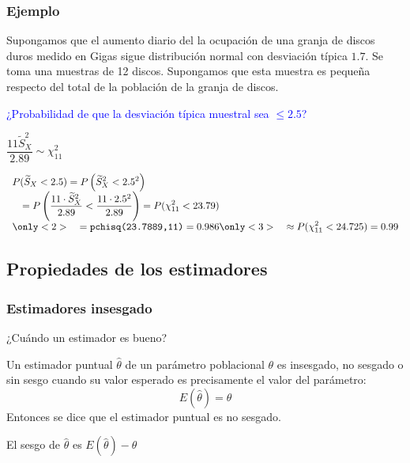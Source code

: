 \documentclass[12pt,t]{beamer}
\newcommand{\blue}[1]{\textcolor{blue}{#1}}
\renewcommand{\emph}[1]{{\color{red}#1}}
\renewcommand{\leq}{\leqslant}
\theoremstyle{plain}
\theoremstyle{definition}
\begin{document}
\begin{frame}
\frametitle{Ejemplo}
\vspace*{-2ex}

Supongamos que  el  aumento  diario del la ocupación de una granja de  discos duros medido  en Gigas sigue distribución normal con desviación típica $1.7$. Se toma una muestras de 12 discos. Supongamos que esta  muestra es pequeña respecto del total de la población de la granja de discos.
\medskip

\blue{¿Probabilidad de que la desviación típica muestral
sea $\leq 2.5$?}
\medskip

$\dfrac{11\widetilde{S}_{X}^2}{2.89}\sim \chi^2_{11}$
\medskip

$\begin{array}{l}
\displaystyle P(\widetilde{S}_{X}<2.5)= P\left(\widetilde{S}_{X}^2<2.5^2\right)\\
\quad \displaystyle =P\left(\frac{11\cdot \widetilde{S}_{X}^2}{2.89}<\frac{11
\cdot 2.5^2}{2.89}\right)= P(\chi_{11}^2<23.79)\\
\only<2>{\quad\displaystyle=\mbox{\texttt{pchisq(23.7889,11)}}=0.986}
\only<3>{\quad \displaystyle \approx P(\chi_{11}^2<24.725)=0.99}
\end{array}$
        
\end{frame}


\subsection{Propiedades de los estimadores}


\begin{frame}
\frametitle{Estimadores insesgado}

¿Cuándo un estimador es bueno?
\medskip

Un estimador puntual $\widehat{\theta}$ de un parámetro  poblacional
$\theta$ es  \emph{insesgado, no sesgado o sin sesgo} cuando su valor esperado es precisamente el valor del parámetro:
$$
E(\widehat{\theta})=\theta
$$ 
Entonces se dice que el estimador puntual es \emph{no sesgado}.
\medskip

El  \emph{sesgo} de $\widehat{\theta}$ es $E(\widehat{\theta})-\theta$

\end{frame}
\end{document}
